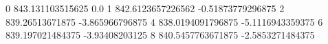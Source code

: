 0 843.131103515625 0.0
1 842.6123657226562 -0.51873779296875
2 839.26513671875 -3.865966796875
4 838.0194091796875 -5.1116943359375
6 839.197021484375 -3.93408203125
8 840.5457763671875 -2.5853271484375
